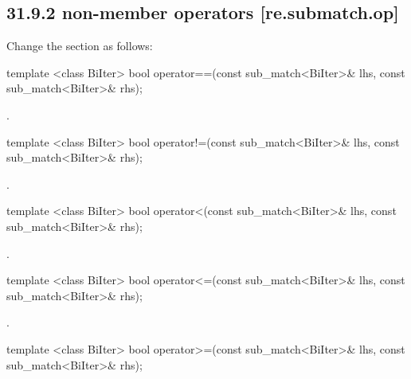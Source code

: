 \documentclass[ebook,11pt,article]{memoir}
\begin{document}
\subsection{31.9.2  non-member operators [re.submatch.op]}
Change the section as follows:

\begin{itemdecl}
template <class BiIter>
  bool operator==(const sub_match<BiIter>& lhs, const sub_match<BiIter>& rhs); 
\end{itemdecl}

\begin{itemdescr}
\pnum\returns  {}.
\end{itemdescr}

\begin{itemdecl}
template <class BiIter>
  bool operator!=(const sub_match<BiIter>& lhs, const sub_match<BiIter>& rhs); 
\end{itemdecl}

\begin{itemdescr}
\pnum\returns {}.
\end{itemdescr}

\begin{itemdecl}
template <class BiIter>
  bool operator<(const sub_match<BiIter>& lhs, const sub_match<BiIter>& rhs); 
\end{itemdecl}

\begin{itemdescr}
\pnum\returns  {}.
\end{itemdescr}

\begin{itemdecl}
template <class BiIter>
  bool operator<=(const sub_match<BiIter>& lhs, const sub_match<BiIter>& rhs); 
\end{itemdecl}

\begin{itemdescr}
\pnum\returns  {}.
\end{itemdescr}

\begin{itemdecl}
template <class BiIter>
  bool operator>=(const sub_match<BiIter>& lhs, const sub_match<BiIter>& rhs); 
\end{itemdecl}
\end{document}
